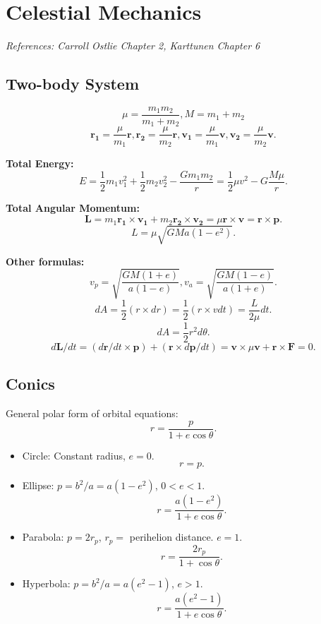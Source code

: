 \documentclass[12pt]{article}
\begin{document}
\newpage
\section{Celestial Mechanics}

\textit{References: Carroll Ostlie Chapter 2, Karttunen Chapter 6}

\subsection{Two-body System}

\[\mu = \frac{m_1m_2}{m_1 + m_2}, M = m_1+m_2\]
\[\mathbf{r_1} = \frac{\mu}{m_1}\mathbf{r}, \mathbf{r_2} = \frac{\mu}{m_2}\mathbf{r}, \mathbf{v_1} = \frac{\mu}{m_1}\mathbf{v}, \mathbf{v_2} = \frac{\mu}{m_2}\mathbf{v}.\]

\textbf{Total Energy:}
\[E = \frac{1}{2}m_1v_1^2 + \frac{1}{2}m_2v_2^2 - \frac{Gm_1m_2}{r} =  \frac{1}{2}\mu v^2 - G\frac{M\mu}{r}.\]

\textbf{Total Angular Momentum:}
\[\mathbf{L} = m_1\mathbf{r_1}\times \mathbf{v_1} + m_2\mathbf{r_2}\times\mathbf{v_2} = \mu \mathbf{r}\times \mathbf{v} = \mathbf{r}\times \mathbf{p}.\]
\[L = \mu\sqrt{GMa(1-e^2)}.\]

\textbf{Other formulas:}
\[v_p = \sqrt{\frac{GM(1+e)}{a(1-e)}}, v_a = \sqrt{\frac{GM(1-e)}{a(1+e)}}.\]
\[dA = \frac{1}{2}(r\times dr) = \frac{1}{2}(r\times vdt) = \frac{L}{2\mu}dt.\]
\[dA = \frac{1}{2}r^2d\theta.\]
\[d\mathbf{L}/dt = (d\mathbf{r}/dt\times \mathbf{p}) + (\mathbf{r}\times d\mathbf{p}/dt) = \mathbf{v}\times \mu \mathbf{v} + \mathbf{r}\times \mathbf{F} = 0.\]

\subsection{Conics}

General polar form of orbital equations: 
\[r = \frac{p}{1 + e\cos{\theta}}.\]

\begin{itemize}
    \item Circle: Constant radius, $e=0$.
    \[r = p.\]
    \item Ellipse: $p = b^2/a = a(1-e^2)$, $0 < e < 1$.
    \[r = \frac{a(1-e^2)}{1 + e\cos{\theta}}.\]
    \item Parabola: $p = 2r_p$, $r_p=$ perihelion distance. $e=1$.
    \[r = \frac{2r_p}{1+\cos{\theta}}.\]
    \item Hyperbola: $p = b^2/a = a(e^2-1)$, $e > 1$. 
    \[r = \frac{a(e^2-1)}{1+e\cos{\theta}}.\]
\end{itemize}
\end{document}
